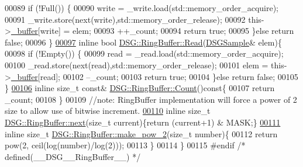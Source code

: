 \begin{DoxyCode}
00089         \textcolor{keywordflow}{if} (!Full()) \{
00090             write = \_write.load(std::memory\_order\_acquire);
00091             \_write.store(next(write),std::memory\_order\_release);
00092             this->\hyperlink{_driver_8cpp_acce4d24812914a6b276156d1a3d3e851}{\_buffer}[write] = elem;
00093             ++\_count;
00094             \textcolor{keywordflow}{return} \textcolor{keyword}{true};
00095         \}\textcolor{keywordflow}{else} \textcolor{keywordflow}{return} \textcolor{keyword}{false};
00096     \}
\hypertarget{_ring_buffer_8h_source_l00097}{}\hyperlink{class_d_s_g_1_1_ring_buffer_a6b2848a64f15c7b0c320779582fa0fbe}{00097}     \textcolor{keyword}{inline} \textcolor{keywordtype}{bool} \hyperlink{class_d_s_g_1_1_ring_buffer_a6b2848a64f15c7b0c320779582fa0fbe}{DSG::RingBuffer::Read}(\hyperlink{namespace_d_s_g_ac39a94cd27ebcd9c1e7502d0c624894a}{DSGSample}& elem)\{
00098         \textcolor{keywordflow}{if} (!Empty()) \{
00099             read = \_read.load(std::memory\_order\_acquire);
00100             \_read.store(next(read),std::memory\_order\_release);
00101             elem = this->\hyperlink{_driver_8cpp_acce4d24812914a6b276156d1a3d3e851}{\_buffer}[read];
00102             --\_count;
00103             \textcolor{keywordflow}{return} \textcolor{keyword}{true};
00104         \}\textcolor{keywordflow}{else} \textcolor{keywordflow}{return} \textcolor{keyword}{false};
00105     \}
\hypertarget{_ring_buffer_8h_source_l00106}{}\hyperlink{class_d_s_g_1_1_ring_buffer_a9bd79b0a6dff618b205e396c101ee070}{00106}     \textcolor{keyword}{inline} \textcolor{keywordtype}{size\_t} \textcolor{keyword}{const}& \hyperlink{class_d_s_g_1_1_ring_buffer_a9bd79b0a6dff618b205e396c101ee070}{DSG::RingBuffer::Count}()\textcolor{keyword}{const}\{
00107         \textcolor{keywordflow}{return} \_count;
00108     \}
00109     \textcolor{comment}{//note: RingBuffer implementation will force a power of 2 size to allow use of bitwise increment.}
\hypertarget{_ring_buffer_8h_source_l00110}{}\hyperlink{class_d_s_g_1_1_ring_buffer_a6d7a76a4c9b38ccde46344662e08c9e5}{00110}     \textcolor{keyword}{inline} \textcolor{keywordtype}{size\_t} \hyperlink{class_d_s_g_1_1_ring_buffer_a6d7a76a4c9b38ccde46344662e08c9e5}{DSG::RingBuffer::next}(\textcolor{keywordtype}{size\_t} current)\{\textcolor{keywordflow}{return} (current+1) & MASK;\}
\hypertarget{_ring_buffer_8h_source_l00111}{}\hyperlink{class_d_s_g_1_1_ring_buffer_aaf481e139011e91b111cc048e726cafb}{00111}     \textcolor{keyword}{inline} \textcolor{keywordtype}{size\_t} \hyperlink{class_d_s_g_1_1_ring_buffer_aaf481e139011e91b111cc048e726cafb}{DSG::RingBuffer::make\_pow\_2}(\textcolor{keywordtype}{size\_t} number)\{
00112         \textcolor{keywordflow}{return} pow(2, ceil(log(number)/log(2)));
00113     \}
00114 \}
00115 \textcolor{preprocessor}{#endif }\textcolor{comment}{/* defined(\_\_DSG\_\_RingBuffer\_\_) */}\textcolor{preprocessor}{}
\end{DoxyCode}
